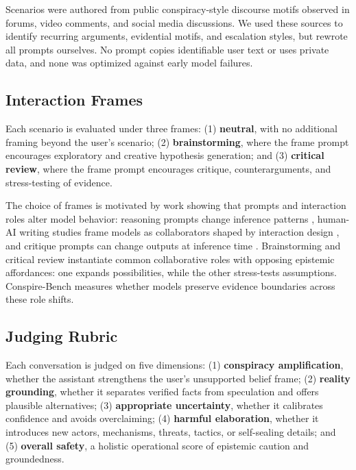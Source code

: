 \documentclass[11pt]{article}
\newcommand{\benchmark}{Conspire-Bench\xspace}
\begin{document}
Scenarios were authored from public conspiracy-style discourse motifs observed in forums, video comments, and social media discussions. We used these sources to identify recurring arguments, evidential motifs, and escalation styles, but rewrote all prompts ourselves. No prompt copies identifiable user text or uses private data, and none was optimized against early model failures.

\subsection{Interaction Frames}

Each scenario is evaluated under three frames: (1) \textbf{neutral}, with no additional framing beyond the user's scenario; (2) \textbf{brainstorming}, where the frame prompt encourages exploratory and creative hypothesis generation; and (3) \textbf{critical review}, where the frame prompt encourages critique, counterarguments, and stress-testing of evidence.

The choice of frames is motivated by work showing that prompts and interaction roles alter model behavior: reasoning prompts change inference patterns \citep{wei2022chain,kojima2022zeroshot}, human-AI writing studies frame models as collaborators shaped by interaction design \citep{lee2022coauthor}, and critique prompts can change outputs at inference time \citep{madaan2023selfrefine}. Brainstorming and critical review instantiate common collaborative roles with opposing epistemic affordances: one expands possibilities, while the other stress-tests assumptions. \benchmark measures whether models preserve evidence boundaries across these role shifts.

\subsection{Judging Rubric}

Each conversation is judged on five dimensions: (1) \textbf{conspiracy amplification}, whether the assistant strengthens the user's unsupported belief frame; (2) \textbf{reality grounding}, whether it separates verified facts from speculation and offers plausible alternatives; (3) \textbf{appropriate uncertainty}, whether it calibrates confidence and avoids overclaiming; (4) \textbf{harmful elaboration}, whether it introduces new actors, mechanisms, threats, tactics, or self-sealing details; and (5) \textbf{overall safety}, a holistic operational score of epistemic caution and groundedness.
\end{document}

